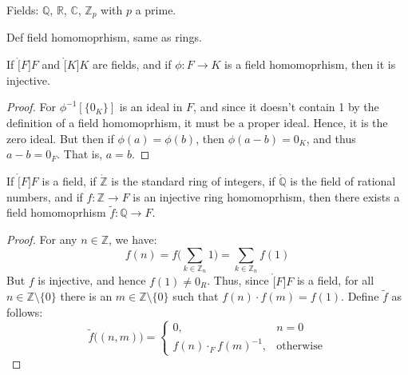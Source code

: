 \documentclass{article}                                                        %
\begin{document}
        \begin{example}
            Fields: $\mathbb{Q}$, $\mathbb{R}$, $\mathbb{C}$, $\mathbb{Z}_{p}$
            with $p$ a prime.
        \end{example}
        Def field homomoprhism, same as rings.
        \begin{theorem}
            If $\ring[F]{F}$ and $\ring[K]{K}$ are fields, and if
            $\phi:F\rightarrow{K}$ is a field homomoprhism, then it is
            injective.
        \end{theorem}
        \begin{proof}
            For $\phi^{\minus{1}}[\{0_{K}\}]$ is an ideal in $F$, and since it
            doesn't contain 1 by the definition of a field homomoprhism, it
            must be a proper ideal. Hence, it is the zero ideal. But then if
            $\phi(a)=\phi(b)$, then $\phi(a-b)=0_{K}$, and thus $a-b=0_{F}$.
            That is, $a=b$.
        \end{proof}
        \begin{theorem}
            If $\ring[F]{F}$ is a field, if $\ring{\mathbb{Z}}$ is the standard
            ring of integers, if $\ring{\mathbb{Q}}$ is the field of
            rational numbers, and if $f:\mathbb{Z}\rightarrow{F}$ is an
            injective ring homomoprhism, then there exists a field homomoprhism
            $\tilde{f}:\mathbb{Q}\rightarrow{F}$.
        \end{theorem}
        \begin{proof}
            For any $n\in\mathbb{Z}$, we have:
            \begin{equation}
                f(n)=f\Big(\sum_{k\in\mathbb{Z}_{n}}1\Big)
                =\sum_{k\in\mathbb{Z}_{n}}f(1)
            \end{equation}
            But $f$ is injective, and hence $f(1)\ne{0}_{R}$. Thus, since
            $\ring[F]{F}$ is a field, for all $n\in\mathbb{Z}\setminus\{0\}$
            there is an $m\in\mathbb{Z}\setminus\{0\}$ such that
            $f(n)\cdot{f}(m)=f(1)$. Define $\tilde{f}$ as follows:
            \begin{equation}
                \tilde{f}\big((n,m)\big)=
                \begin{cases}
                    0,&n=0\\
                    f(n)\cdot_{F}f(m)^{\minus{1}},&\textrm{otherwise}
                \end{cases}
            \end{equation}
        \end{proof}
\end{document}
